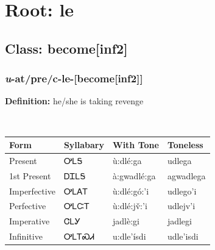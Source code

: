 \needspace{4in}
\section*{Root: le}
\nopagebreak
{}
\needspace{3in}
\subsection*{Class: become[inf2]}
\nopagebreak
\needspace{2in}
\subsubsection*{\textit{u}{-}at/pre/c{-}\textbf{le}{-}[become[inf2]]}
\nopagebreak
\textbf{Definition: } he/she is taking revenge
\\[0.5em]
\begin{tabularx}{\textwidth}{l X X X}%
\toprule%
\textbf{Form}&\textbf{Syllabary}&\textbf{With Tone}&\textbf{Toneless}\\%
\midrule%
Present&ᎤᏞᎦ&ù:dlé:ga&udlega\\%
1st Present&ᎠᏆᏞᎦ&à:gwadlé:ga&agwadlega\\%
Imperfective&ᎤᏞᎪᎢ&ù:dlé:gó:’i&udlego’i\\%
Perfective&ᎤᏞᏨᎢ&ù:dlé:jv̌:’i&udlejv’i\\%
Imperative&ᏣᏞᎩ&jadlè:gi&jadlegi\\%
Infinitive&ᎤᏞᎢᏍᏗ&u:dle’ísdi&udle’isdi\\%
\bottomrule%
\end{tabularx}
\\[1em]